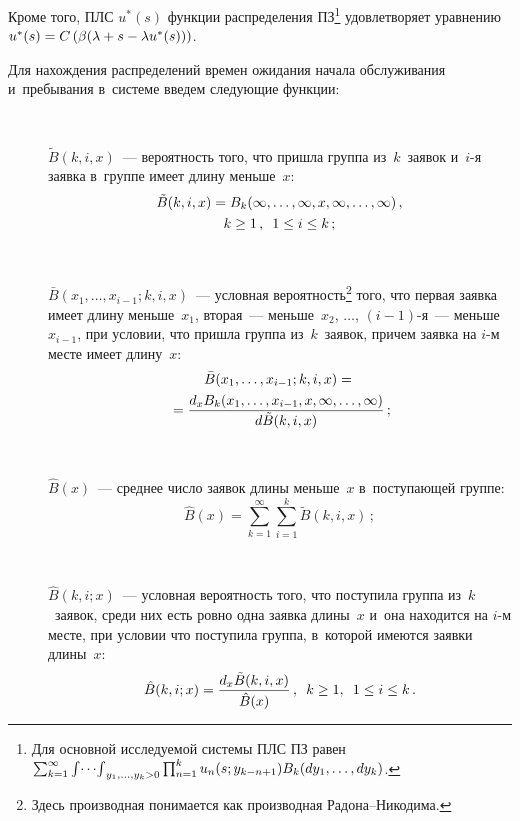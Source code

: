 \begin{multicols}{2}
Кроме того, ПЛС $u^*(s)$ функции распределения
ПЗ\footnote{Для основной
исследуемой системы ПЛС ПЗ равен $\sum\nolimits_{k=1}^\infty
\mathop{\int\!\cdots\!\int}\nolimits_{y_1,\ldots,y_{k}>0}
\prod\nolimits_{n=1}^k u_{n}(s;y_{k-n+1})
B_k(dy_1,\dots,dy_k)$.}
удовлетворяет уравнению $u^*(s)\hm=C\left ( \beta(\lambda\hm+s\hm-\lambda u^*(s)) \right)$.

Для нахождения распределений времен ожидания начала обслуживания 
и~пребывания в~системе введем следующие функции:
\begin{description}
\item[\,] ${\tilde B}(k,i,x)$~--- вероятность того, что пришла группа из~$k$~заявок 
и~$i$-я заявка в~группе имеет длину меньше~$x$:
\begin{multline*}
{\tilde B}(k,i,x)=B_k(\infty,\dots,\infty,x,\infty, \dots, \infty)\,,\\ 
k \ge 1\,,\enskip 1 \le i \le k\,;
\end{multline*}

\item[\,] ${\bar B}(x_1,\dots,x_{i-1};k,i,x)$~---
условная 
вероятность\footnote{Здесь производная понимается
как производная Ра\-до\-на--Ни\-ко\-ди\-ма.} того, что первая заявка имеет
длину меньше~$x_1$, вторая~--- меньше~$x_2$, $\dots$, $(i-1)$-я~--- меньше $x_{i-1}$,
при условии, что пришла группа из~$k$~заявок, причем заявка на $i$-м месте имеет
длину~$x$:
\begin{multline*}
{\bar B}(x_1,\dots,x_{i-1};k,i,x)={}\\
{}=\displaystyle\frac{\displaystyle d_x B_k(x_1,\dots,x_{i-1},x,\infty, 
\dots, \infty)\mathstrut}{\displaystyle d {\tilde B}(k,i,x)\mathstrut}\,;
\end{multline*} 

\item[\,] ${\hat B}(x)$~---  среднее число заявок длины
меньше~$x$ в~поступающей группе:
$$
{\hat B}(x) = \sum\limits_{k=1}^\infty 
\sum\limits_{i=1}^k {\tilde B}(k,i,x)\,;
$$

\item[\,] ${\hat B}(k,i;x)$~---
условная вероятность того, что поступила группа из~$k$~заявок, среди них
есть ровно одна заявка длины~$x$ и~она находится на $i$-м месте, при условии что
поступила группа, в~которой имеются заявки длины~$x$:
$$
{\hat B}(k,i;x)=\displaystyle\frac{\displaystyle d_x {\tilde B}(k,i,x)\mathstrut}{\displaystyle {\hat B}(x)\mathstrut}\,, \enskip
k \ge 1,\enskip 1 \le i \le k\,.
$$

\end{description}


\end{multicols}
